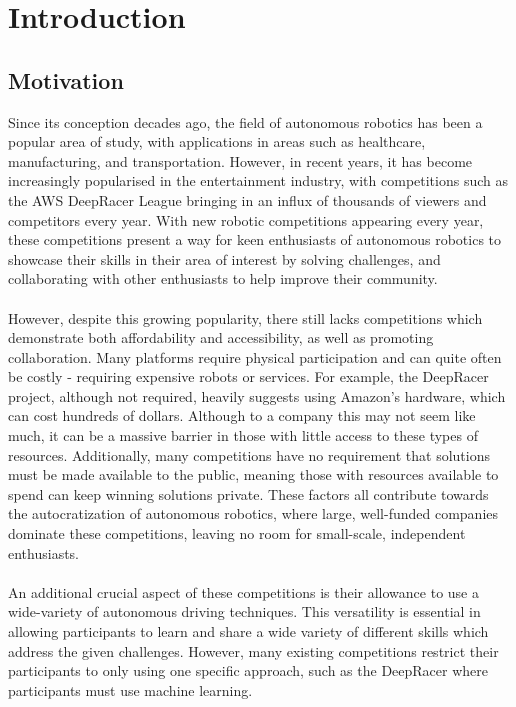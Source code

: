 \documentclass{l4proj}
\begin{document}
\chapter{Introduction}

\section{Motivation}
Since its conception decades ago, the field of autonomous robotics has been a popular area of study, with applications in areas such as healthcare, manufacturing, and transportation. However, in recent years, it has become increasingly popularised in the entertainment industry, with competitions such as the AWS DeepRacer League bringing in an influx of thousands of viewers and competitors every year. With new robotic competitions appearing every year, these competitions present a way for keen enthusiasts of autonomous robotics to showcase their skills in their area of interest by solving challenges, and collaborating with other enthusiasts to help improve their community.
\\\\
However, despite this growing popularity, there still lacks competitions which demonstrate both affordability and accessibility, as well as promoting collaboration. Many platforms require physical participation and can quite often be costly - requiring expensive robots or services. For example, the DeepRacer project, although not required, heavily suggests using Amazon's hardware, which can cost hundreds of dollars. Although to a company this may not seem like much, it can be a massive barrier in those with little access to these types of resources. Additionally, many competitions have no requirement that solutions must be made available to the public, meaning those with resources available to spend can keep winning solutions private. These factors all contribute towards the autocratization of autonomous robotics, where large, well-funded companies dominate these competitions, leaving no room for small-scale, independent enthusiasts.
\\\\
An additional crucial aspect of these competitions is their allowance to use a wide-variety of autonomous driving techniques. This versatility is essential in allowing participants to learn and share a wide variety of different skills which address the given challenges. However, many existing competitions restrict their participants to only using one specific approach, such as the DeepRacer where participants must use machine learning.
\end{document}

